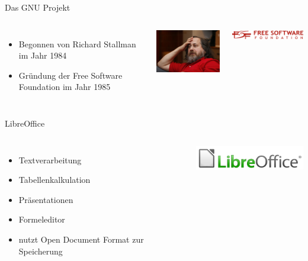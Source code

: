 \documentclass[12pt]{beamer}
\begin{document}
\begin{frame}{Das GNU Projekt}
  \begin{columns}
    \column{6cm}

    \begin{itemize}
      \item Begonnen von Richard Stallman im Jahr 1984 
      \item Gründung der Free Software Foundation im Jahr 1985 
    \end{itemize}

    \column{7cm}

    \begin{center}
      \includegraphics[width=4.5cm]{img/stallman}
    \par\end{center}

    \begin{center}
      \includegraphics[width=5cm]{img/logo-fsf}
    \par\end{center}
  \end{columns}
\end{frame}

\begin{frame}{LibreOffice}
  \begin{columns}
    \column{6cm}

    \begin{itemize}
      \item Textverarbeitung
      \item Tabellenkalkulation
      \item Präsentationen
      \item Formeleditor
      \item nutzt Open Document Format zur Speicherung
    \end{itemize}

    \column{5cm}

    \begin{center}
      \includegraphics[width=5cm]{img/LibreOffice}
    \par\end{center}
  \end{columns}
\end{frame}
\end{document}
